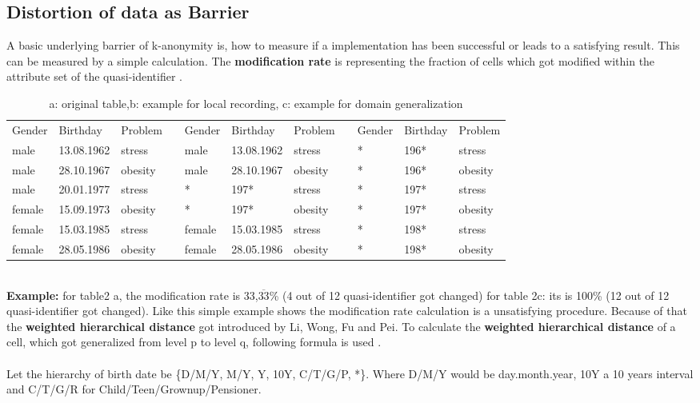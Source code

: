 \documentclass{llncs}
\begin{document}
\subsection{Distortion of data as Barrier} 
A basic underlying barrier of k-anonymity is, how to measure if a implementation has been successful or leads to a satisfying result. This can be measured by a simple calculation.
The \textbf{modification rate} is representing the fraction of cells which got modified within the attribute set of the quasi-identifier \cite{li2006achieving}.
\begin{table}[]
	\centering
	\label{table2}
	\caption{a: original table,b: example for local recording, c: example for domain generalization }
	\begin{tabular}{lllllllllll}
		\cline{1-3} \cline{5-7} \cline{9-11}
		Gender & Birthday   & Problem &  & Gender & Birthday   & Problem &  & Gender & Birthday & Problem \\ \cline{1-3} \cline{5-7} \cline{9-11} 
		male   & 13.08.1962 & stress  &  & male   & 13.08.1962 & stress  &  & *      & 196*     & stress  \\
		male   & 28.10.1967 & obesity &  & male   & 28.10.1967 & obesity &  & *      & 196*     & obesity \\
		male   & 20.01.1977 & stress  &  & *      & 197*       & stress  &  & *      & 197*     & stress  \\
		female & 15.09.1973 & obesity &  & *      & 197*       & obesity &  & *      & 197*     & obesity \\
		female & 15.03.1985 & stress  &  & female & 15.03.1985 & stress  &  & *      & 198*     & stress  \\
		female & 28.05.1986 & obesity &  & female & 28.05.1986 & obesity &  & *      & 198*     & obesity \\ \cline{1-3} \cline{5-7} \cline{9-11}
	\end{tabular}
	
\end{table}\\
\textbf{Example:} for table2 a, the modification rate is  33,$\overline{33}$\% (4 out of 12 quasi-identifier got changed) for table 2c: its is 100\% (12 out of 12 quasi-identifier got changed). Like this simple example shows the modification rate calculation is a unsatisfying procedure. Because of that the \textbf{weighted hierarchical distance} got introduced by Li, Wong, Fu and Pei. 
To calculate the \textbf{weighted hierarchical distance} of a cell, which got generalized from level p to level q, following formula is used \cite{li2006achieving}.\\
\cite{li2006achieving}\\
Let the hierarchy of birth date be \{D/M/Y, M/Y, Y, 10Y, C/T/G/P, *\}. Where D/M/Y  would be day.month.year, 10Y a 10 years interval and C/T/G/R for Child/Teen/Grownup/Pensioner.\\
\end{document}
